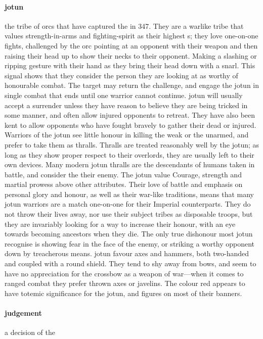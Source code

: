 \paragraph{jotun} the tribe of  orcs that have captured the  in 347. They are a warlike tribe that values strength-in-arms and fighting-spirit as their highest s; they love one-on-one fights, challenged by the orc pointing at an opponent with their weapon and then raising their head up to show their necks to their opponent. Making a slashing or ripping gesture with their hand as they bring their head down with a snarl. This signal shows that they consider the person they are looking at as worthy of honourable combat. The target may return the challenge, and engage the jotun in single combat that ends until one warrior cannot continue. jotun will usually accept a surrender unless they have reason to believe they are being tricked in some manner, and often allow injured opponents to retreat. They have also been kent to allow opponents who have fought bravely to gather their dead or injured. Warriors of the jotun see little honour in killing the weak or the unarmed, and prefer to take them as thralls. Thralls are treated reasonably well by the jotun; as long as they show proper respect to their overlords, they are usually left to their own devices. Many modern jotun thralls are the descendants of humans taken in battle, and consider the  their enemy. The jotun value Courage, strength and martial prowess above other attributes. Their love of battle and emphasis on personal glory and honour, as well as their war-like traditions, means that many jotun warriors are a match one-on-one for their Imperial counterparts. They do not throw their lives away, nor use their subject tribes as disposable troops, but they are invariably looking for a way to increase their honour, with an eye towards becoming ancestors when they die. The only true dishonour most jotun recognise is showing fear in the face of the enemy, or striking a worthy opponent down by treacherous means. jotun favour axes and hammers, both two-handed and coupled with a round shield. They tend to shy away from bows, and seem to have no appreciation for the crossbow as a weapon of war—when it comes to ranged combat they prefer thrown axes or javelins. The colour red appears to have totemic significance for the jotun, and figures on most of their banners. 
\paragraph{judgement} a decision of the 
